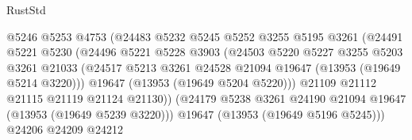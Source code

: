 \begin{lexlean}{RustStd}
\begin{coremodule}
                                      @5246
                                      @5253
                                      @4753
                                      (@24483
                                        @5232
                                        @5245
                                        @5252
                                        @3255
                                        @5195
                                        @3261
                                        (@24491
                                          @5221
                                          @5230
                                          (@24496
                                            @5221
                                            @5228
                                            @3903
                                            (@24503
                                              @5220
                                              @5227
                                              @3255
                                              @5203
                                              @3261
                                              @21033
                                              (@24517
                                                @5213
                                                @3261
                                                @24528
                                                @21094
                                                @19647
                                                (@13953 (@19649 @5214 @3220)))
                                              @19647
                                              (@13953 (@19649 @5204 @5220)))
                                            @21109
                                            @21112
                                            @21115
                                            @21119
                                            @21124
                                            @21130))
                                        (@24179
                                          @5238
                                          @3261
                                          @24190
                                          @21094
                                          @19647
                                          (@13953 (@19649 @5239 @3220)))
                                        @19647
                                        (@13953 (@19649 @5196 @5245)))
                                      @24206
                                      @24209
                                      @24212

\end{coremodule}
\end{lexlean}
